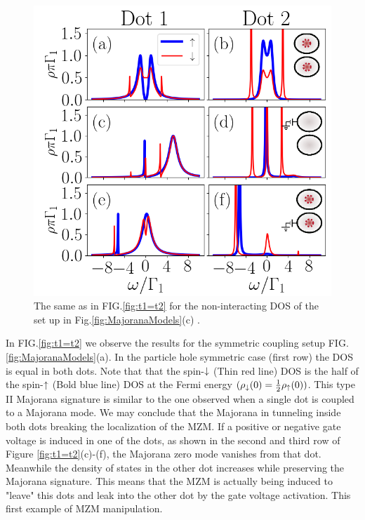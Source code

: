 \documentclass[showpacs,aps,prb,reprint,superscriptaddress]{revtex4-1}
\begin{document}
\begin{figure}[bt]
\begin{center}
\includegraphics[scale=0.48]{Graficos/t2>0.png}
\caption{  \label{fig:t2>0} The same as in FIG.\ref{fig:t1=t2} for the non-interacting DOS of the set up in Fig.\ref{fig:MajoranaModels}(c) .
}
%
\end{center}
\end{figure}
     
    
     In FIG.\ref{fig:t1=t2} we observe the results for the symmetric coupling setup FIG.\ref{fig:MajoranaModels}(a). In the particle hole symmetric case (first row) the DOS is equal in both dots. Note that that the spin-$\downarrow$ (Thin red line) DOS is the half of the spin-$\uparrow$ (Bold blue line) DOS at the Fermi energy $(\rho_\downarrow(0) = \frac{1}{2}\rho_\uparrow(0))$. This type II Majorana signature is similar to the one observed when a single dot is coupled to a Majorana mode. \cite{liu_detecting_2011} We may conclude that the Majorana in tunneling inside both dots breaking the localization of the MZM. If a positive or negative gate voltage is induced in one of the dots, as shown in the second and third row of Figure \ref{fig:t1=t2}(c)-(f),  the Majorana zero mode vanishes from that dot. Meanwhile the density of states in the other dot increases while preserving the Majorana signature. This means that the MZM is actually being induced to "leave" this dots and leak into the other dot by the gate voltage activation. This first example of MZM manipulation. 
\end{document}
